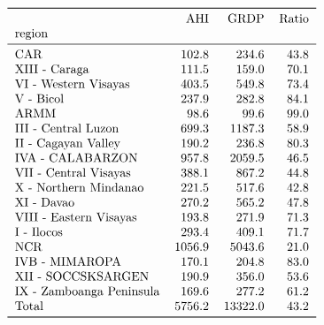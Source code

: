 \documentclass[10pt]{article}
\begin{document}
\[\begin{tabular}{lrrr}
\toprule
{} &    AHI &     GRDP &  Ratio \\
region                   &         &          &        \\
\midrule
CAR                      &   102.8 &    234.6 &   43.8 \\
XIII - Caraga            &   111.5 &    159.0 &   70.1 \\
VI - Western Visayas     &   403.5 &    549.8 &   73.4 \\
V - Bicol                &   237.9 &    282.8 &   84.1 \\
ARMM                     &    98.6 &     99.6 &   99.0 \\
III - Central Luzon      &   699.3 &   1187.3 &   58.9 \\
II - Cagayan Valley      &   190.2 &    236.8 &   80.3 \\
IVA - CALABARZON         &   957.8 &   2059.5 &   46.5 \\
VII - Central Visayas    &   388.1 &    867.2 &   44.8 \\
X - Northern Mindanao    &   221.5 &    517.6 &   42.8 \\
XI - Davao               &   270.2 &    565.2 &   47.8 \\
VIII - Eastern Visayas   &   193.8 &    271.9 &   71.3 \\
I - Ilocos               &   293.4 &    409.1 &   71.7 \\
NCR                      &  1056.9 &   5043.6 &   21.0 \\
IVB - MIMAROPA           &   170.1 &    204.8 &   83.0 \\
XII - SOCCSKSARGEN       &   190.9 &    356.0 &   53.6 \\
IX - Zamboanga Peninsula &   169.6 &    277.2 &   61.2 \\
Total                    &  5756.2 &  13322.0 &   43.2 \\
\bottomrule
\end{tabular}
\]
\end{document}
